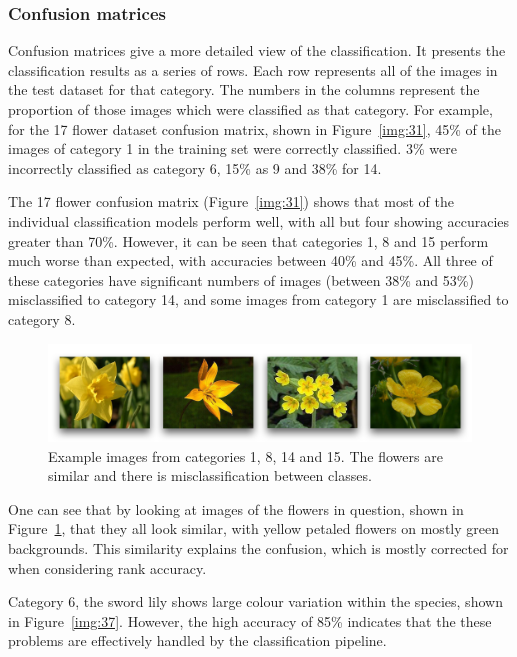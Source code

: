 \documentclass[11pt, a4paper]{report}
\begin{document}
\subsubsection{Confusion matrices}

Confusion matrices give a more detailed view of the classification. It presents the classification results as a series of rows. Each row represents all of the images in the test dataset for that category. The numbers in the columns represent the proportion of those images which were classified as that category. For example, for the 17 flower dataset confusion matrix, shown in Figure~\ref{img:31}, 45\% of the images of category 1 in the training set were correctly classified. 3\% were incorrectly classified as category 6, 15\% as 9 and 38\% for 14.

The 17 flower confusion matrix (Figure~\ref{img:31}) shows that most of the individual classification models perform well, with all but four showing accuracies greater than 70\%. However, it can be seen that categories 1, 8 and 15 perform much worse than expected, with accuracies between 40\% and 45\%. All three of these categories have significant numbers of images (between 38\% and 53\%) misclassified to category 14, and some images from category 1 are misclassified to category 8.

\begin{figure}[hbt]
	\centering
  \includegraphics[totalheight=4cm]{img/36.png}
  \caption{Example images from categories 1, 8, 14 and 15. The flowers are similar and there is misclassification between classes.}
  \label{img:36}
\end{figure}

One can see that by looking at images of the flowers in question, shown in Figure~\ref{img:36}, that they all look similar, with yellow petaled flowers on mostly green backgrounds. This similarity explains the confusion, which is mostly corrected for when considering rank accuracy. 

Category 6, the sword lily shows large colour variation within the species, shown in Figure~\ref{img:37}. However, the high accuracy of 85\% indicates that the these problems are effectively handled by the classification pipeline.
\end{document}
